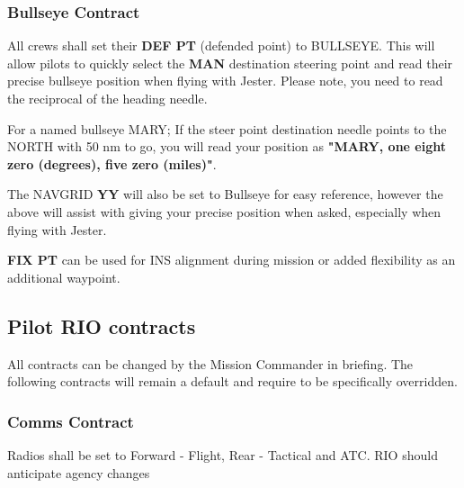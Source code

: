 \subsubsection{Bullseye Contract}
\label{subsubsec:contract-bullseye}

All crews shall set their \textbf{DEF PT} (defended point) to BULLSEYE.
This will allow pilots to quickly select the \textbf{MAN} destination steering
point and read their precise bullseye position when flying with Jester. Please
note, you need to read the reciprocal of the heading needle.

For a named bullseye MARY; If the steer point destination needle points to the
NORTH with 50 nm to go, you will read your position as \textbf{"MARY, one eight
zero (degrees), five zero (miles)"}.

The NAVGRID \textbf{YY} will also be set to Bullseye for easy reference,
however the above will assist with giving your precise position when asked,
especially when flying with Jester.

\textbf{FIX PT} can be used for INS alignment during mission or added
flexibility as an additional waypoint.

\subsection{Pilot RIO contracts}

All contracts can be changed by the Mission Commander in briefing. The
following contracts will remain a default and require to be specifically
overridden.

\newpage

\subsubsection{Comms Contract}

Radios shall be set to Forward - Flight, Rear - Tactical and ATC. RIO should
anticipate agency changes

